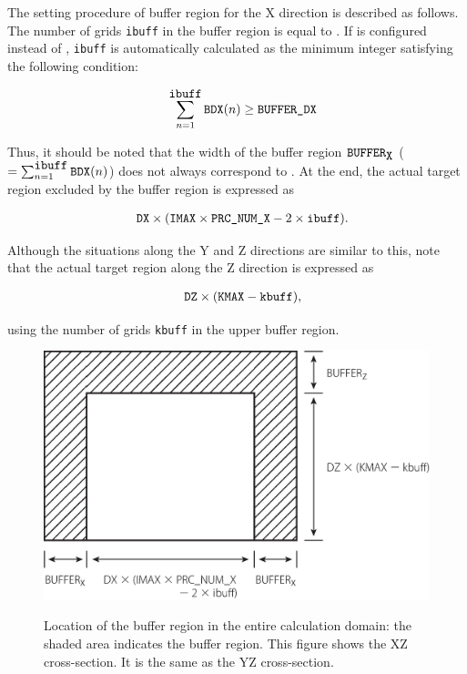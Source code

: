 The setting procedure of buffer region for the X direction is described as follows.
The number of grids \verb|ibuff| in the buffer region is equal to .
If  is configured instead of , \verb|ibuff| is automatically calculated as the minimum integer satisfying the following condition:

\begin{eqnarray}
   && \sum_{n=1}^{\verb|ibuff|} \verb|BDX|(n) \ge \nmitemeq{BUFFER_DX} \nonumber
\end{eqnarray}

Thus, it should be noted that the width of the buffer region $\verb|BUFFER|_{\verb|X|}$ ($= \sum_{n=1}^{\verb|ibuff|} \verb|BDX|(n)$) does not always correspond to . At the end, the actual target region excluded by the buffer region is expressed as

\begin{eqnarray}
   && \nmitemeq{DX} \times ( \nmitemeq{IMAX} \times \nmitemeq{PRC_NUM_X} - 2 \times \verb|ibuff| ).
\end{eqnarray}

Although the situations along the Y and Z directions are similar to this, note that the actual target region along the Z direction is expressed as

\begin{eqnarray}
   && \nmitemeq{DZ} \times ( \nmitemeq{KMAX} - \verb|kbuff| ),
\end{eqnarray}

using the number of grids \verb|kbuff| in the upper buffer region.

\begin{figure}[t]
\begin{center}
  \includegraphics[width=0.8\hsize]{./figure/buffer_xz.eps}\\
  \caption{Location of the buffer region in the entire calculation domain: the shaded area indicates the buffer region. This figure shows the XZ cross-section. It is the same as the YZ cross-section.}
  \label{fig:buff_xz}
\end{center}
\end{figure}


